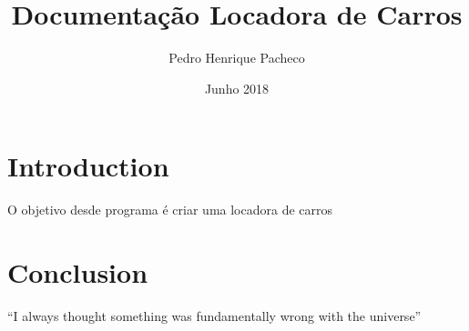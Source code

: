 \documentclass{article}
\title{Documentação Locadora de Carros}
\author{Pedro Henrique Pacheco}
\date{Junho 2018}
\begin{document}
\maketitle

\section{Introduction}
O objetivo desde programa é criar uma locadora de carros

\section{Conclusion}
``I always thought something was fundamentally wrong with the universe'' 
\end{document}
